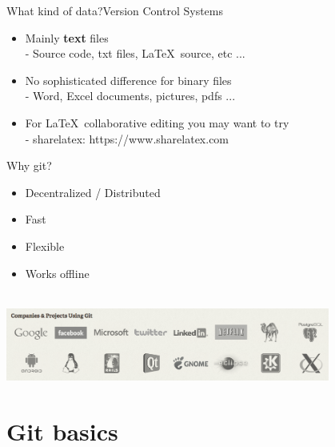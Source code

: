 \documentclass[10pt,xcolor=dvipsnames]{beamer}
\begin{document}
\begin{frame}{What kind of data?}{Version Control Systems}
\begin{itemize}
  \setlength\itemsep{0.4in}
\item Mainly {\bf text} files\\
- Source code, txt files, \LaTeX\  source, etc ...
\item No sophisticated difference for binary files\\
- Word, Excel documents, pictures, pdfs ...
\item For \LaTeX\ collaborative editing you may want to try\\
- sharelatex: https://www.sharelatex.com
\end{itemize}
\end{frame}



\begin{frame}{Why git?}
\begin{itemize}
\item Decentralized / Distributed
\item Fast
\item Flexible
\item Works offline
\end{itemize}
~\\[0.2in]
\centering
\includegraphics[width = 0.8\textwidth]{companies.png}\\
\end{frame}
\section{Git basics}
\end{document}
